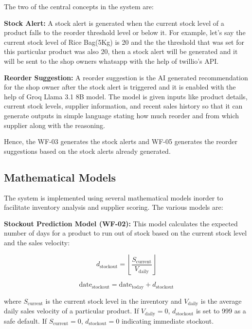 \documentclass[journal]{IEEEtran}
\begin{document}
The two of the central concepts in the system are:

\textbf{Stock Alert:} A stock alert is generated when the current stock level of a product falls to the reorder threshold level or below it. For example, let's say the current stock level of Rice Bag(5Kg) is 20 and the the threshold that was set for this particular product was also 20, then a stock alert will be generated and it will be sent to the shop owners whatsapp with the help of twillio's API.

\textbf{Reorder Suggestion:} A reorder suggestion is the AI generated recommendation for the shop owner after the stock alert is triggered and it is enabled with the help of Groq Llama 3.1 8B model. The model is given inputs like product details, current stock levels, supplier information, and recent sales history so that it can generate outputs in simple language stating how much reorder and from which supplier along with the reasoning.

Hence, the WF-03 generates the stock alerts and WF-05 generates the reorder suggestions based on the stock alerts already generated.

\subsection{Mathematical Models}

The system is implemented using several mathematical models inorder to facilitate inventory analysis and supplier scoring. The various models are:

\textbf{Stockout Prediction Model (WF-02):}
This model calculates the expected number of days for a product to run out of stock based on the current stock level and the sales velocity:

\begin{equation}
\label{eq:stockout_days}
d_{\text{stockout}} = \left\lfloor \frac{S_{\text{current}}}{V_{\text{daily}}} \right\rfloor
\end{equation}

\begin{equation}
\label{eq:stockout_date}
\text{date}_{\text{stockout}} = \text{date}_{\text{today}} + d_{\text{stockout}}
\end{equation}

where $S_{\text{current}}$ is the current stock level in the inventory and $V_{\text{daily}}$ is the average daily sales velocity of a particular product. If $V_{\text{daily}} = 0$, $d_{\text{stockout}}$ is set to 999 as a safe default. If $S_{\text{current}} = 0$, $d_{\text{stockout}} = 0$ indicating immediate stockout.
\end{document}
